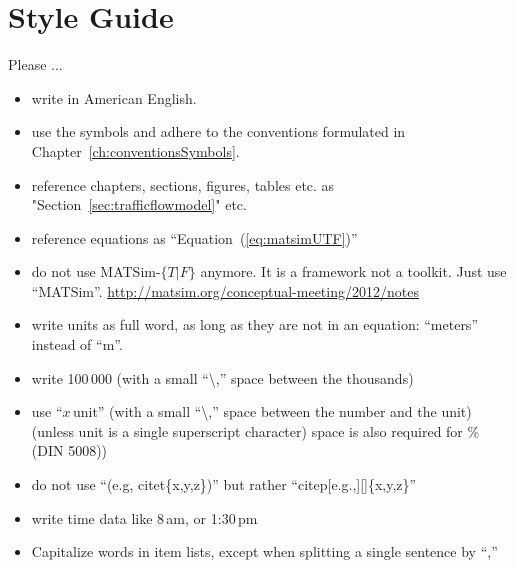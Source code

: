 



\section*{Style Guide}
\label{sec:styleguide}

Please ...

\begin{itemize}

\item write in American English.

\item use the symbols and adhere to the conventions formulated in Chapter~\ref{ch:conventionsSymbols}.

\item reference chapters, sections, figures, tables etc. as "Section~\ref{sec:trafficflowmodel}" etc.

\item reference equations as ``Equation~(\ref{eq:matsimUTF})''

\item do not use MATSim-$\{T\lvert F\}$ anymore. It is a framework not a toolkit. Just use ``MATSim''. \url{http://matsim.org/conceptual-meeting/2012/notes}

\item write units as full word, as long as they are not in an equation: ``meters'' instead of ``m''. 

\item write 100\,000 (with a small ``\textbackslash,'' space between the thousands)

\item use ``$x$\,unit'' (with a small ``\textbackslash,'' space between the number and the unit) (unless unit is a single superscript character) space is also required for \% (DIN 5008))

\item do not use ``(e.g, citet\{x,y,z\})'' but rather ``citep[e.g.,][]\{x,y,z\}''

\item write time data like 8\,am, or 1:30\,pm

\item Capitalize words in item lists, except when splitting a single sentence by ``,''

\end{itemize}

